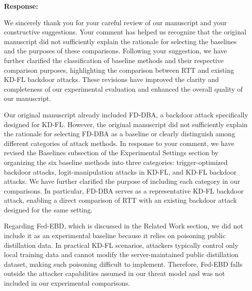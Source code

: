 \documentclass[11pt,a4paper]{article}
\newcommand{\manualindent}{\par\noindent\hspace*{1.5em}\ignorespaces}
\newcommand{\authorresponse}[1]{%
  {\bfseries\color{replyblue}Response:}\par
  #1\par\vspace{0.35em}%
}
\begin{document}
\authorresponse{\manualindent We sincerely thank you for your careful review of our manuscript and your constructive suggestions.
Your comment has helped us recognize that the original manuscript did not sufficiently explain the rationale for selecting the baselines and the purposes of these comparisons.
Following your suggestion, we have further clarified the classification of baseline methods and their respective comparison purposes, highlighting the comparison between RTT and existing KD-FL backdoor attacks.
These revisions have improved the clarity and completeness of our experimental evaluation and enhanced the overall quality of our manuscript.

\manualindent Our original manuscript already included FD-DBA, a backdoor attack specifically designed for KD-FL.
However, the original manuscript did not sufficiently explain the rationale for selecting FD-DBA as a baseline or clearly distinguish among different categories of attack methods.
In response to your comment, we have revised the Baselines subsection of the Experimental Settings section by organizing the six baseline methods into three categories: trigger-optimized backdoor attacks, logit-manipulation attacks in KD-FL, and KD-FL backdoor attacks. 
We have further clarified the purpose of including each category in our comparisons. 
In particular, FD-DBA serves as a representative KD-FL backdoor attack, enabling a direct comparison of RTT with an existing backdoor attack designed for the same setting.

\manualindent Regarding Fed-EBD, which is discussed in the Related Work section, we did not include it as an experimental baseline because it relies on poisoning public distillation data. 
In practical KD-FL scenarios, attackers typically control only local training data and cannot modify the server-maintained public distillation dataset, making such poisoning difficult to implement. 
Therefore, Fed-EBD falls outside the attacker capabilities assumed in our threat model and was not included in our experimental comparisons.}
\end{document}
